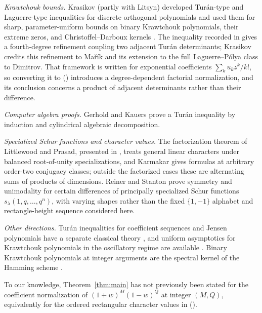 \documentclass[twoside,10pt]{article}
\numberwithin{equation}{section}
\theoremstyle{slbody}
\theoremstyle{definition}
\theoremstyle{remark}
\numberwithin{theorem}{section}
\renewcommand{\eqref}[1]{%
  \textup{{\normalfont(\oldstylenums{\ref{#1}}}\normalfont)}}
\begin{document}
\emph{Krawtchouk bounds.}  Krasikov (partly with Litsyn)
developed Tur\'an-type and Laguerre-type inequalities for discrete
orthogonal polynomials and used them for sharp, parameter-uniform bounds on
binary Krawtchouk polynomials, their extreme zeros, and
Christoffel--Darboux kernels
\cite{krasikovlitsyn96,krasikov-cd,krasikov-laguerre,krasikov-turan}.
The inequality recorded in
\cite[Theorem~5, (18), p.~79]{krasikov-turan} gives a fourth-degree
refinement coupling two adjacent Tur\'an determinants; Krasikov credits
this refinement to Ma\v{r}\'{i}k and its extension to the full
Laguerre--P\'olya class to Dimitrov.  That framework is written for
exponential coefficients $\sum_k u_kz^k/k!$, so converting it to
\eqref{eq:pdef} introduces a degree-dependent factorial normalization, and
its conclusion concerns a product of adjacent determinants rather than
their difference.

\emph{Computer algebra proofs.}  Gerhold and Kauers
\cite[Section~2]{gerholdkauers06} prove a Tur\'an inequality by induction
and cylindrical algebraic decomposition.

\emph{Specialized Schur functions and character values.}
The factorization theorem of Littlewood and Prasad, presented in
\cite[arXiv version~3, Theorem~2.5]{ayyerkumari22}, treats general linear
characters under balanced root-of-unity specializations, and Karmakar
\cite[arXiv version~1, Theorem~4.1]{karmakar25} gives formulas at arbitrary
order-two conjugacy classes; outside the factorized cases these are
alternating sums of products of dimensions.  Reiner and Stanton
\cite{reinerstanton98} prove symmetry and unimodality for certain
differences of principally specialized Schur functions
$s_\lambda(1,q,\dots,q^n)$, with varying shapes rather than the fixed
$\{1,-1\}$ alphabet and rectangle-height sequence considered here.

\emph{Other directions.}  Tur\'an inequalities for coefficient sequences
and Jensen polynomials have a separate classical theory
\cite{cravencsordas89}, and uniform asymptotics for Krawtchouk polynomials
in the oscillatory regime are available \cite{liwong00}.  Binary Krawtchouk
polynomials at integer arguments are the spectral kernel of the Hamming
scheme \cite{delsarte73,levenshtein95,macwilliamssloane77}.

To our knowledge, Theorem~\ref{thm:main} has not previously been stated for
the coefficient normalization of $(1+w)^M(1-w)^Q$ at integer $(M,Q)$,
equivalently for the ordered rectangular character values in
\eqref{eq:schur-character}.
\end{document}
